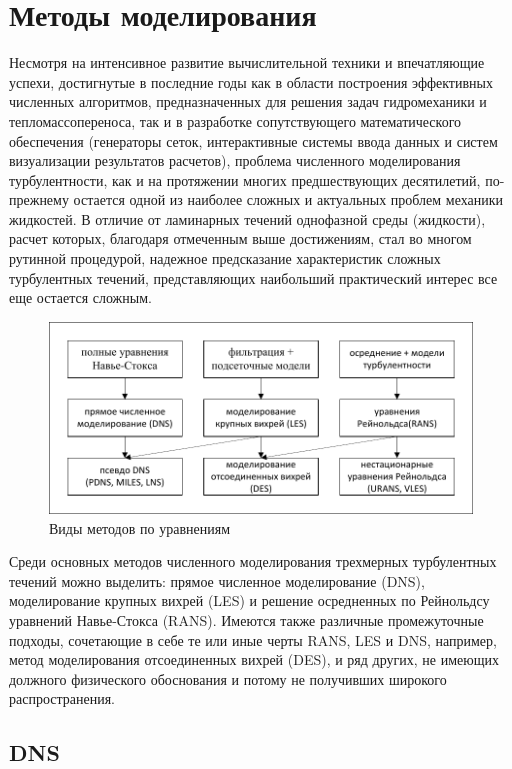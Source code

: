 \section{Методы моделирования}
	
	Несмотря на интенсивное развитие вычислительной техники и впечатляющие успехи, достигнутые в последние годы как в области построения эффективных численных алгоритмов, предназначенных для решения задач гидромеханики и тепломассопереноса, так и в разработке сопутствующего математического обеспечения (генераторы сеток, интерактивные системы ввода данных и систем визуализации результатов расчетов), проблема численного моделирования турбулентности, как и на протяжении многих предшествующих десятилетий, по-прежнему остается одной из наиболее сложных и актуальных проблем механики жидкостей. В отличие от ламинарных течений однофазной среды (жидкости), расчет которых, благодаря отмеченным выше достижениям, стал во многом рутинной процедурой, надежное предсказание характеристик сложных турбулентных течений, представляющих наибольший практический интерес все еще остается сложным.
	\begin{figure}[H]
		\centering
		\includegraphics[width=0.9\linewidth]{../Assets/СхемаМетодов}
		\caption{Виды методов по уравнениям}
		\label{fig:cheme}
	\end{figure}
	
	Среди основных методов численного моделирования трехмерных турбулентных течений можно выделить: прямое численное моделирование (DNS), моделирование крупных вихрей (LES) и решение осредненных по Рейнольдсу уравнений Навье-Стокса (RANS). Имеются также различные промежуточные подходы, сочетающие в себе те или иные черты RANS, LES и DNS, например, метод моделирования отсоединенных вихрей (DES), и ряд других, не имеющих должного физического обоснования и потому не получивших широкого распространения.

\subsection{DNS}
	
